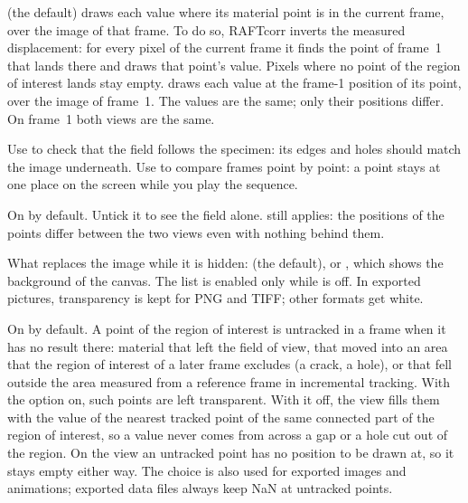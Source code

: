 \begin{description}[leftmargin=1.2cm,style=nextline]
  \item[Show on]
     (the default) draws each value where its material point is in the
    current frame, over the image of that frame. To do so, RAFTcorr inverts the measured
    displacement: for every pixel of the current frame it finds the point of frame~1 that lands
    there and draws that point's value. Pixels where no point of the region of interest lands
    stay empty.  draws each value at the frame-1 position of its point,
    over the image of frame~1. The values are the same; only their positions differ. On
    frame~1 both views are the same.

    Use  to check that the field follows the specimen: its edges and holes
    should match the image underneath. Use  to compare frames point by point:
    a point stays at one place on the screen while you play the sequence.
  \item[Show background image]
    On by default. Untick it to see the field alone.  still applies: the positions
    of the points differ between the two views even with nothing behind them.
  \item[Hidden background]
    What replaces the image while it is hidden:  (the default),  or
    , which shows the background of the canvas. The list is enabled only while
     is off. In exported pictures, transparency is kept for PNG and
    TIFF; other formats get white.
  \item[Hide untracked regions]
    On by default. A point of the region of interest is untracked in a frame when it has no
    result there: material that left the field of view, that moved into an area that the region
    of interest of a later frame excludes (a crack, a hole), or that fell outside the area
    measured from a reference frame in incremental tracking. With the option on, such points are left
    transparent. With it off, the  view fills them with the value of the
    nearest tracked point of the same connected part of the region of interest, so a value never
    comes from across a gap or a hole cut out of the region. On the  view an
    untracked point has no position to be drawn at, so it stays empty either way.
    The choice is also used for exported images and animations; exported data files always
    keep NaN at untracked points.
\end{description}

